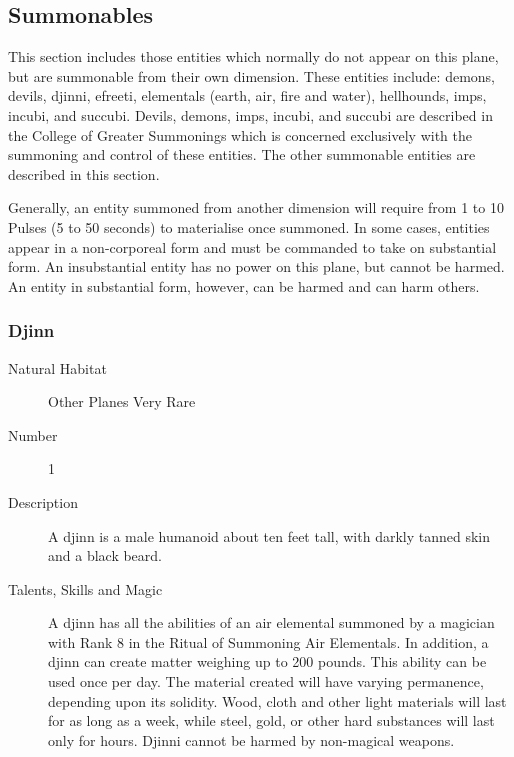 \begin{multicols*}{2}

\setlength\columnseprule{0.2mm}

\section{Summonables}
This section includes those entities which normally do not appear on
this plane, but are summonable from their own dimension.  These
entities include: demons, devils, djinni, efreeti, elementals (earth,
air, fire and water), hellhounds, imps, incubi, and succubi.  Devils,
demons, imps, incubi, and succubi are described in the College of
Greater Summonings which is concerned exclusively with the summoning
and control of these entities.  The other summonable entities are
described in this section.

Generally, an entity summoned from another dimension will require from
1 to 10 Pulses (5 to 50 seconds) to materialise once summoned.  In
some cases, entities appear in a non-corporeal form and must be
commanded to take on substantial form.  An insubstantial entity has no
power on this plane, but cannot be harmed. An entity in substantial
form, however, can be harmed and can harm others.


\subsubsection{Djinn}

\begin{description}
\item[Natural Habitat]  Other Planes Very Rare

\item[Number] 1

\item[Description] A djinn is a male humanoid about ten feet tall, with
darkly tanned skin and a black beard.

\item[Talents, Skills and Magic] A djinn has all the abilities of an air elemental summoned
by a magician with Rank 8 in the Ritual of Summoning Air Elementals.
In addition, a djinn can create matter weighing up to 200 pounds.
This ability can be used once per day.  The material created will have
varying permanence, depending upon its solidity. Wood, cloth and other
light materials will last for as long as a week, while steel, gold, or
other hard substances will last only for hours. Djinni cannot be
harmed by non-magical weapons.


\end{description}
\end{multicols*}
